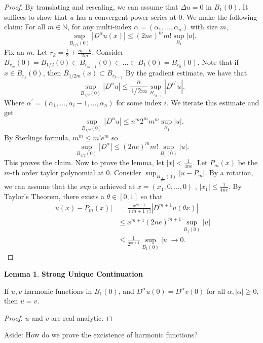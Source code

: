 \documentclass[12pt, a4paper]{article}
\theoremstyle{definition}
\newtheorem{lemma}{Lemma}
\newcommand{\N}{\mathbb{N}}                           %
\begin{document}
\begin{proof}
	By translating and rescaling, we can assume that $\Delta u = 0$ in $B_1(0)$. It suffices to show that $u$ has a convergent power series at $0$.
We make the following claim: 
	For all $m \in \N$, for any multi-index $\alpha = (\alpha_1, \dots, \alpha_n)$ with size $m$,
	$$ \sup_{B_{1/2}(0)} \left| D^\alpha u(x) \right| \leq (2ne)^m m!\sup_{B_1}|u|.$$ 
	Fix an $m$. Let $r_k = \frac{ 1 }{ 2 } + \frac{ m-k }{ 2m }$. Consider $B_{r_m} (0) = B_{1/2}(0) \subset B_{r_{m-1}} (0) \subset \dots \subset B_1(0) = B_{r_0}(0)$. 
	Note that if $x\in B_{r_k}(0)$, then $B_{1/2m}(x) \subset B_{r_{k-1}}$
	By the gradient estimate, we have that 
	$$ \sup_{{B_{1/2}}(0)} \left| D^\alpha u \right| \leq \frac{ n }{ 1/2m } \sup_{B_{r_{m-1}}} \left| D^{\alpha^\prime} u \right|. $$ 
	Where $\alpha^\prime  = (\alpha_1 , \dots , \alpha_i - 1, \dots , \alpha_n)$ for some index $i$. We iterate this estimate and get
	$$ \sup_{B_{1/2}(0)} \left| D^\alpha u  \right| \leq n^m 2^m m^m \sup_{B_1} |u|. $$ 
	By Sterlings formula, $m^m \leq m! e^m$ so
	$$ \sup_{B_{1/2}(0)} \left| D^\alpha \right| \leq (2ne)^m m! \sup_{B_1(0)}|u|. $$
	This proves the claim. 
	Now to prove the lemma, let $|x| < \frac{ 1 }{ 4ne }$. Let $P_m(x)$ be the $m$-th order taylor polynomial at $0$. Consider $\sup_{B_{ \frac{ 1 }{ 4ne }}(0)} |u-P_m|$. By a rotation, we can assume that the $sup$ is achieved at $x = (x_1,0,  \dots , 0)$ , $|x_1| \leq \frac{ 1 }{ 4ne }$. 
	By Taylor's Theorem, there exists a $\theta \in [0,1]$ so that 
	\begin{align*}
	\left| u(x) - P_m(x) \right| & = \frac{ x^{m+1} }{ (m+1)! } \left| D^{m+1} u(\theta x) \right|
		\\ & \leq x^{m+1} (2ne)^{m+1} \sup_{ B_1(0) } |u|
		\\ & \leq \frac{ 1 }{ 2^{m+1} } \sup_{B_1(0)} |u| \to 0. 
	\end{align*}
\end{proof}
\begin{tcolorbox}
\begin{lemma}
	\textbf{Strong Unique Continuation}
\end{lemma}
	If $u,v$ harmonic functions in $B_1(0)$, and $D^\alpha u(0) = D^\alpha v (0)$ for all $\alpha, |\alpha| \geq 0$, then $u = v$. 
\end{tcolorbox}
\begin{proof}
$u$ and $v$ are real analytic. 
\end{proof}
Aside: How do we prove the excistence of harmonic functions?
\end{document}
